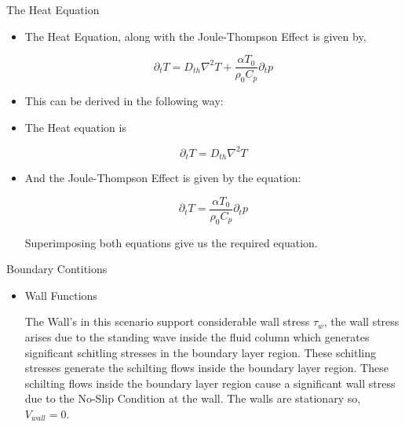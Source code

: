 \documentclass{beamer}
\begin{document}
\begin{frame}{The Heat Equation}
\begin{itemize}

\item The Heat Equation, along with the Joule-Thompson Effect is given by,

\begin{equation}
\partial_t T = D_{th} \nabla ^ 2 T + \frac{\alpha T_0}{\rho_0 C_p} \partial_t p
\end{equation}


\item This can be derived in the following way:

\item The Heat equation is

\begin{equation*}
\partial_t T = D_{th} \nabla^2 T
\end{equation*}

\item And the Joule-Thompson Effect is given by the equation:

\begin{equation*}
\partial_t T = \frac{\alpha T_0}{\rho_0 C_p} \partial_t p
\end{equation*}


Superimposing both equations give us the required equation.


\end{itemize}
\end{frame}

\begin{frame}{Boundary Contitions}

\begin{itemize}

\item Wall Functions

The Wall's in this scenario support considerable wall stress $\tau_w$, the wall stress arises due to the standing wave inside the fluid column which generates significant schitling stresses in the boundary layer region.
These schitling stresses generate the schilting flows inside the boundary layer region. These schilting flows inside the boundary layer region cause a significant wall stress due to the No-Slip Condition at the wall. The walls are stationary so, $V_{wall} = 0$.

\end{itemize}

\end{frame}
\end{document}
